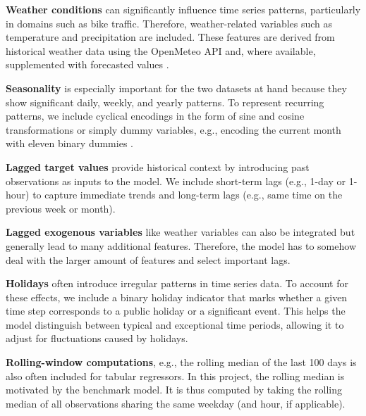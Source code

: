 \textbf{Weather conditions} can significantly influence time series patterns, particularly in domains such as bike traffic. Therefore, weather-related variables such as temperature and precipitation are included. These features are derived from historical weather data using the OpenMeteo API and, where available, supplemented with forecasted values  \parencite{zippenfenig_open-meteocom_2024}.

\textbf{Seasonality} is especially important for the two datasets at hand because they show significant daily, weekly, and yearly patterns. To represent recurring patterns, we include cyclical encodings in the form of sine and cosine transformations or simply dummy variables, e.g., encoding the current month with eleven binary dummies \parencite[Chapter~7.4]{hyndman_forecasting_2021}.

\textbf{Lagged target values} provide historical context by introducing past observations as inputs to the model. We include short-term lags (e.g., 1-day or 1-hour) to capture immediate trends and long-term lags (e.g., same time on the previous week or month).

\textbf{Lagged exogenous variables} like weather variables can also be integrated but generally lead to many additional features. Therefore, the model has to somehow deal with the larger amount of features and select important lags.

\textbf{Holidays} often introduce irregular patterns in time series data. To account for these effects, we include a binary holiday indicator that marks whether a given time step corresponds to a public holiday or a significant event. This helps the model distinguish between typical and exceptional time periods, allowing it to adjust for fluctuations caused by holidays.

\textbf{Rolling-window computations}, e.g., the rolling median of the last 100 days is also often included for tabular regressors. In this project, the rolling median is motivated by the benchmark model. It is thus computed by taking the rolling median of all observations sharing the same weekday (and hour, if applicable).


